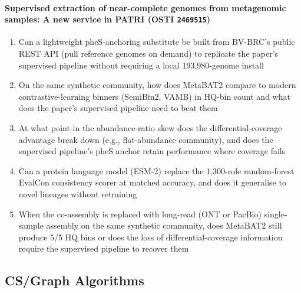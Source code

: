 \documentclass[11pt]{article}
\begin{document}
\paragraph{Supervised extraction of near-complete genomes from metagenomic samples: A new service in PATRI \textnormal{\small(OSTI \texttt{2469515})}}
\begin{enumerate}[leftmargin=1.6em,itemsep=0.2em,topsep=0.2em,label=Q\arabic*.]
\item Can a lightweight pheS-anchoring substitute be built from BV-BRC's public REST API (pull reference genomes on demand) to replicate the paper's supervised pipeline without requiring a local 193,980-genome install
\item On the same synthetic community, how does MetaBAT2 compare to modern contrastive-learning binners (SemiBin2, VAMB) in HQ-bin count and what does the paper's supervised pipeline need to beat them
\item At what point in the abundance-ratio skew does the differential-coverage advantage break down (e.g., flat-abundance community), and does the supervised pipeline's pheS anchor retain performance where coverage fails
\item Can a protein language model (ESM-2) replace the 1,300-role random-forest EvalCon consistency scorer at matched accuracy, and does it generalise to novel lineages without retraining
\item When the co-assembly is replaced with long-read (ONT or PacBio) single-sample assembly on the same synthetic community, does MetaBAT2 still produce 5/5 HQ bins or does the loss of differential-coverage information require the supervised pipeline to recover them
\end{enumerate}
\subsection*{CS/Graph Algorithms}
\end{document}
